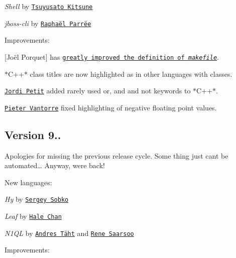 \begin{DoxyItemize}
\item {\itshape Shell} by \href{https://github.com/MakeNowJust}{\tt Tsuyusato Kitsune}
\item {\itshape jboss-\/cli} by \href{https://github.com/rparree}{\tt Raphaël Parrëe}
\end{DoxyItemize}

Improvements\+:


\begin{DoxyItemize}
\item \mbox{[}Joël Porquet\mbox{]} has \href{https://github.com/isagalaev/highlight.js/commit/5b3e0e68bfaae282faff6697d6a490567fa9d44b}{\tt greatly improved the definition of {\itshape makefile}}.
\item $\ast$\+C++$\ast$ class titles are now highlighted as in other languages with classes.
\item \href{https://github.com/jordi-petit}{\tt Jordi Petit} added rarely used {\ttfamily or}, {\ttfamily and} and {\ttfamily not} keywords to $\ast$\+C++$\ast$.
\item \href{https://github.com/NuclearCookie}{\tt Pieter Vantorre} fixed highlighting of negative floating point values.
\end{DoxyItemize}

\subsection*{Version 9..}

Apologies for missing the previous release cycle. Some thing just can\textquotesingle{}t be automated… Anyway, we\textquotesingle{}re back!

New languages\+:


\begin{DoxyItemize}
\item {\itshape Hy} by \href{https://github.com/profitware}{\tt Sergey Sobko}
\item {\itshape Leaf} by \href{https://github.com/halechan}{\tt Hale Chan}
\item {\itshape N1\+QL} by \href{https://github.com/andrestaht}{\tt Andres Täht} and \href{https://github.com/nene}{\tt Rene Saarsoo}
\end{DoxyItemize}

Improvements\+:


